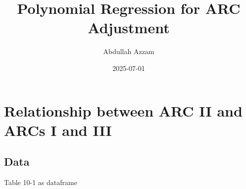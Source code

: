 \documentclass[
  letterpaper,
  DIV=11,
  numbers=noendperiod]{scrartcl}
\title{Polynomial Regression for ARC Adjustment}
\author{Abdullah Azzam}
\date{2025-07-01}
\renewcommand*\contentsname{Table of contents}
\newcommand\contentsname{Table of contents}
\begin{document}
\maketitle

\renewcommand*\contentsname{Table of contents}
{
\hypersetup{linkcolor=}
\setcounter{tocdepth}{3}
\tableofcontents
}

\section{Relationship between ARC II and ARCs I and
III}\label{relationship-between-arc-ii-and-arcs-i-and-iii}

\subsection{Data}\label{data}

Table 10-1 as dataframe
\end{document}
